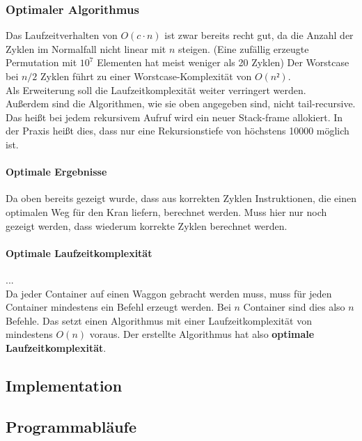 \subsubsection{Optimaler Algorithmus} %
Das Laufzeitverhalten von $O(c \cdot n)$ ist zwar bereits recht gut, da die Anzahl der Zyklen im Normalfall nicht linear mit $n$ steigen.
(Eine zufällig erzeugte Permutation mit $10^7$ Elementen hat meist weniger als 20 Zyklen)%
Der Worstcase bei $n/2$ Zyklen führt zu einer Worstcase-Komplexität von $O(n²)$. \\
Als Erweiterung soll die Laufzeitkomplexität weiter verringert werden. \\
Außerdem sind die Algorithmen, wie sie oben angegeben sind, nicht tail-recursive.
Das heißt bei jedem rekursivem Aufruf wird ein neuer Stack-frame allokiert.
In der Praxis heißt dies, dass nur eine Rekursionstiefe von höchstens 10000 möglich ist.

\paragraph{Optimale Ergebnisse}
Da oben %
bereits gezeigt wurde, dass aus korrekten Zyklen Instruktionen, die einen optimalen Weg für den Kran liefern, berechnet werden.
Muss hier nur noch gezeigt werden, dass wiederum korrekte Zyklen berechnet werden. \\

\paragraph{Optimale Laufzeitkomplexität}
... \\
Da jeder Container auf einen Waggon gebracht werden muss, muss für jeden Container mindestens ein Befehl erzeugt werden.
Bei $n$ Container sind dies also $n$ Befehle. Das setzt einen Algorithmus mit einer Laufzeitkomplexität von mindestens $O(n)$ voraus.
Der erstellte Algorithmus hat also \textbf{optimale Laufzeitkomplexität}.

\subsection{Implementation}
\newpage
\subsection{Programmabläufe}
